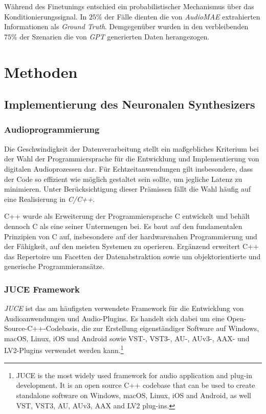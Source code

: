 \documentclass[
  a4paper,  %
  twoside,  %
  bibliography=totoc,
  headsepline,
  cleardoublepage=empty,
  parskip=half,
  draft=false
]{scrbook}
\begin{document}
{Während des Finetunings entschied ein probabilistischer Mechanismus über das Konditionierungssignal. In $25\%$ der Fälle dienten die von \emph{AudioMAE} extrahierten Informationen als \emph{Ground Truth}. Demgegenüber wurden in den verbleibenden $75\%$ der Szenarien die von \emph{GPT} generierten Daten herangezogen. \cite{liu_audioldm2_2023}

\chapter{Methoden}
\section{Implementierung des Neuronalen Synthesizers}
\subsection{Audioprogrammierung}
Die Geschwindigkeit der Datenverarbeitung stellt ein maßgebliches Kriterium bei der Wahl der Programmiersprache für die Entwicklung und Implementierung von digitalen Audioprozessen dar. Für Echtzeitanwendungen gilt insbesondere, dass der Code so effizient wie möglich gestaltet sein sollte, um jegliche Latenz zu minimieren. Unter Berücksichtigung dieser Prämissen fällt die Wahl häufig auf eine Realisierung in \emph{C/C++}. \cite{doumler_c_2015, boulanger_audio_2011}

C++ wurde als Erweiterung der Programmiersprache C entwickelt und behält dennoch C als eine seiner Untermengen bei. Es baut auf den fundamentalen Prinzipien von C auf, insbesondere auf der hardwarenahen Programmierung und der Fähigkeit, auf den meisten Systemen zu operieren. Ergänzend erweitert C++ das Repertoire um Facetten der Datenabstraktion sowie um objektorientierte und generische Programmieransätze. \cite{stroustrup_c_1997}

\subsection{JUCE Framework}
\glqq\emph{JUCE} ist das am häufigsten verwendete Framework für die Entwicklung von Audioanwendungen und Audio-Plugins. Es handelt sich dabei um eine Open-Source-C++-Codebasis, die zur Erstellung eigenständiger Software auf Windows, macOS, Linux, iOS und Android sowie VST-, VST3-, AU-, AUv3-, AAX- und LV2-Plugins verwendet werden kann.\grqq \footnote{
JUCE is the most widely used framework for audio application and plug-in development. It is an open source C++ codebase that can be used to create standalone software on Windows, macOS, Linux, iOS and Android, as well VST, VST3, AU, AUv3, AAX and LV2 plug-ins.
} \cite{noauthor_juce_nodate}

}
\end{document}
